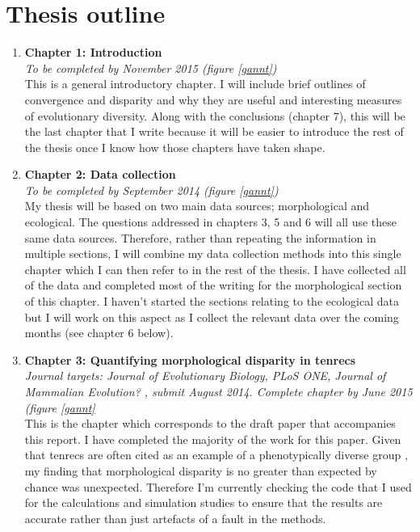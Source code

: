 \documentclass[12pt,a4paper]{article}
\begin{document}
\section{Thesis outline}
\begin{enumerate}
\item \textbf{Chapter 1: Introduction}\\
\textit{To be completed by November 2015 (figure \ref{gannt})}\\

This is a general introductory chapter. I will include brief outlines of convergence and disparity and why they are useful and interesting measures of evolutionary diversity.
Along with the conclusions (chapter 7), this will be the last chapter that I write because it will be easier to introduce the rest of the thesis once I know how those chapters have taken shape. 

\item \textbf{Chapter 2: Data collection}\\
\textit{To be completed by September 2014 (figure \ref{gannt})}\\
My thesis will be based on two main data sources; morphological and ecological. The questions addressed in chapters 3, 5 and 6 will all use these same data sources. Therefore, rather than repeating the information in multiple sections, I will combine my data collection methods into this single chapter which I can then refer to in the rest of the thesis. 
I have collected all of the data and completed most of the writing for the morphological section of this chapter. I haven't started the sections relating to the ecological data but I will work on this aspect as I collect the relevant data over the coming months (see chapter 6 below).




\item \textbf{Chapter 3: Quantifying morphological disparity in tenrecs}\\
\textit{Journal targets: Journal of Evolutionary Biology, PLoS ONE, Journal of Mammalian Evolution? , submit August 2014. 
Complete chapter by June 2015 (figure \ref{gannt}}\\

This is the chapter which corresponds to the draft paper that accompanies this report. I have completed the majority of the work for this paper. Given that tenrecs are often cited as an example of a phenotypically diverse group \citep[e.g.][]{Olson2013}, my finding that morphological disparity is no greater than expected by chance was unexpected. Therefore I'm currently checking the code that I used for the calculations and simulation studies to ensure that the results are accurate rather than just artefacts of a fault in the methods. 


\end{enumerate}
\end{document}
